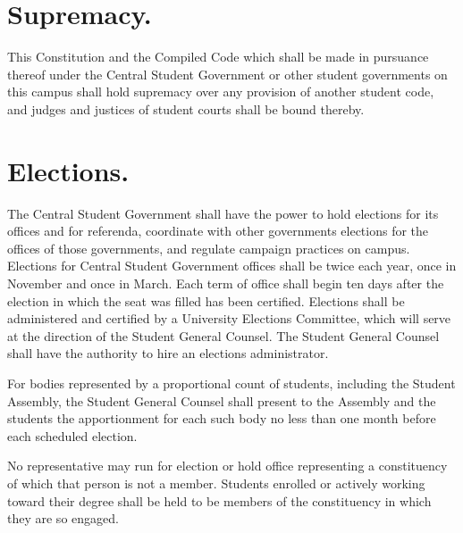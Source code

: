 \section{Supremacy.}
    This Constitution and the Compiled Code which shall be made in pursuance thereof under the Central Student Government or other student governments on this campus shall hold supremacy over any provision of another student code, and judges and justices of student courts shall be bound thereby.

\section{Elections.}
    The Central Student Government shall have the power to hold elections for its offices and for referenda, coordinate with other governments elections for the offices of those governments, and regulate campaign practices on campus. Elections for Central Student Government offices shall be twice each year, once in November and once in March. Each term of office shall begin ten days after the election in which the seat was filled has been certified. Elections shall be administered and certified by a University Elections Committee, which will serve at the direction of the Student General Counsel. The Student General Counsel shall have the authority to hire an elections administrator.

    For bodies represented by a proportional count of students, including the Student Assembly, the Student General Counsel shall present to the Assembly and the students the apportionment for each such body no less than one month before each scheduled election.

    No representative may run for election or hold office representing a constituency of which that person is not a member. Students enrolled or actively working toward their degree shall be held to be members of the constituency in which they are so engaged.